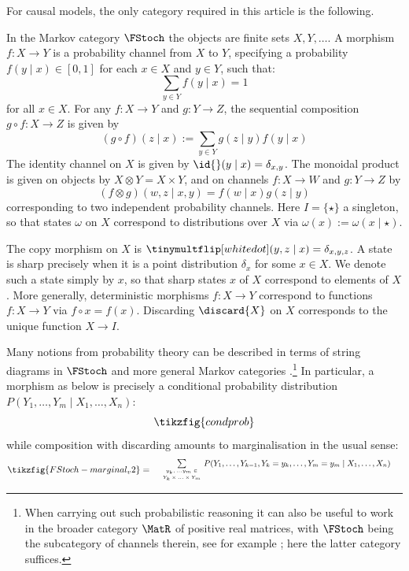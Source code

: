 \documentclass{article}
\begin{document}
For causal models, the only category required in this article is the following.

\begin{example}[$\FStoch$]
In the Markov category $\FStoch$ the objects are finite sets $X, Y, \dots$. A morphism $f \colon X \to Y$ is a probability channel from $X$ to $Y$, specifying a probability $f(y \mid x) \in [0,1]$ for each $x \in X$ and $y \in Y$, such that: 
\[
\sum_{y \in Y} f(y \mid x) = 1
\] 
for all $x \in X$. For any $f \colon X \to Y$ and $g \colon Y \to Z$, the sequential composition $g \circ f \colon X \to Z$ is given by 
\[
(g \circ f) (z \mid x) := \sum_{y \in Y} g(z \mid y) f (y \mid x)
\]
The identity channel on $X$ is given by $\id{}(y \mid x) = \delta_{x,y}$. The monoidal product is given on objects by $X \otimes Y = X \times Y$, and on channels $f \colon X \to W$ and $g \colon Y \to Z$ by 
\[
(f \otimes g)(w, z \mid x, y) = f(w \mid x) g(z \mid y)
\]
corresponding to two independent probability channels. Here $I=\{\star\}$ a singleton, so that states $\omega$ on $X$ correspond to distributions over $X$ via $\omega(x) := \omega(x \mid \star)$.   

The copy morphism on $X$ is $\tinymultflip[whitedot](y,z \mid x) = \delta_{x,y,z}$.  A state is sharp precisely when it is a point distribution $\delta_x$ for some $x \in X$. We denote such a state simply by $x$, so that sharp states $x$ of $X$ correspond to elements of $X$. More generally, deterministic morphisms $f \colon X \to Y$ correspond to functions $f \colon X \to Y$ via $f \circ x = f(x)$. Discarding $\discard{X}$ on $X$ corresponds to the unique function $X \to I$. 


Many notions from probability theory can be described in terms of string diagrams in $\FStoch$ and more general Markov categories .\footnote{When carrying out such probabilistic reasoning it can also be useful to work in the broader category $\MatR$ of positive real matrices, with $\FStoch$ being the subcategory of channels therein, see for example \cite{lorenz2023causal}; here the latter category suffices.} In particular, a morphism as below is precisely a conditional probability distribution $P(Y_1,\dots,Y_m \mid X_1,\dots, X_n)$:  
\[
\tikzfig{condprob}
\] 
while composition with discarding amounts to marginalisation in the usual sense: 
\[
\tikzfig{FStoch-marginal_v2}
=
\begin{minipage}{9.8cm} \centering $\sum\limits_{ \begin{minipage}{1.5cm} \centering \tiny $y_k,...y_m \in$ \\[0.05cm] $Y_k\times ... \times Y_m$  \end{minipage}  }$ {\small $P(Y_1,\dots,Y_{k-1} , Y_k=y_k,\dots,Y_m=y_m\mid X_1,\dots, X_n)$} \end{minipage}
\]
\end{example}
\end{document}
